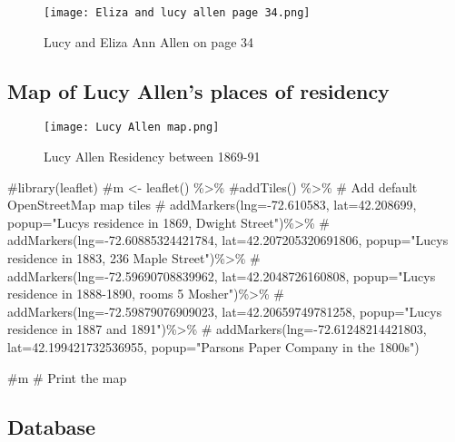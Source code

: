 \documentclass[
  letterpaper,
  DIV=11,
  numbers=noendperiod]{scrartcl}
\newenvironment{Shaded}{\begin{snugshade}}{\end{snugshade}}
\newcommand{\CommentTok}[1]{\textcolor[rgb]{0.37,0.37,0.37}{#1}}
\begin{document}
\begin{figure}

{\centering \texttt{[image: Eliza and lucy allen page 34.png]}

}

\caption{\label{fig-sample10}Lucy and Eliza Ann Allen on page 34}

\end{figure}

\hypertarget{map-of-lucy-allens-places-of-residency}{%
\subsection{Map of Lucy Allen's places of
residency}\label{map-of-lucy-allens-places-of-residency}}

\begin{figure}

{\centering \texttt{[image: Lucy Allen map.png]}

}

\caption{\label{fig-sample11}Lucy Allen Residency between 1869-91}

\end{figure}

\begin{Shaded}
\begin{Highlighting}[]
\CommentTok{\#library(leaflet)}
\CommentTok{\#m \textless{}{-} leaflet() \%\textgreater{}\%}
  \CommentTok{\#addTiles() \%\textgreater{}\%  \# Add default OpenStreetMap map tiles}
 \CommentTok{\# addMarkers(lng={-}72.610583, lat=42.208699, popup="Lucy\textquotesingle{}s residence in 1869, Dwight Street")\%\textgreater{}\%}
 \CommentTok{\# addMarkers(lng={-}72.60885324421784, lat=42.207205320691806, popup="Lucy\textquotesingle{}s residence in 1883, 236 Maple Street")\%\textgreater{}\%}
 \CommentTok{\# addMarkers(lng={-}72.59690708839962, lat=42.2048726160808, popup="Lucy\textquotesingle{}s residence in 1888{-}1890, rooms 5 Mosher")\%\textgreater{}\%}
  \CommentTok{\# addMarkers(lng={-}72.59879076909023, lat=42.20659749781258, popup="Lucy\textquotesingle{}s residence in 1887 and 1891")\%\textgreater{}\%}
 \CommentTok{\# addMarkers(lng={-}72.61248214421803, lat=42.199421732536955, popup="Parsons Paper Company in the 1800s")}


\CommentTok{\#m  \# Print the map}
\end{Highlighting}
\end{Shaded}

\hypertarget{database}{%
\subsection{Database}\label{database}}
\end{document}
